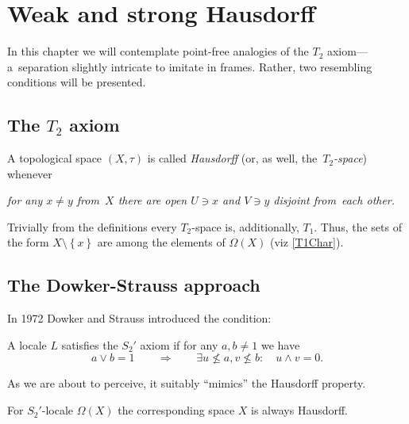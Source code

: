 \chapter{Weak and strong Hausdorff}

In this chapter we will contemplate point-free analogies of the $T_2$
axiom---a~separation slightly intricate to imitate in frames.
Rather, two resembling conditions will be presented.

\section{The $T_2$ axiom}

\begin{framed}
  \begin{df}[$T_2$]
    A topological space $(X, \tau)$ is called \emph{Hausdorff\/} (or, as well,
    the~\emph{$T_2$-space\/}) whenever
    \begin{center} \it
      for any $x \ne y$ from~$X$ there are open $U\owns x$ and $V\owns y$
      disjoint from~each other.
    \end{center}
  \end{df}
\end{framed}

\begin{rem} \label{T2->T1}
  Trivially from the definitions every $T_2$-space is, additionally, $T_1$.
  Thus, the sets of the form $X\setminus \left\{x\right\}$ are among the
  elements of $\Omega(X)$ (viz \ref{T1Char}).
\end{rem}

\section{The Dowker-Strauss approach}

In 1972 Dowker and Strauss \cite{ds72} introduced the condition:

\begin{framed}
  \begin{df}[$S_2'$]
    A locale $L$ satisfies the $S_2'$ axiom if for any $a, b \ne 1$ we have
    \[
      a \vee b = 1 \qquad \Rightarrow \qquad \exists u\not\leq a, v\not\leq
      b: \quad u \wedge v = 0.
    \]
  \end{df}
\end{framed}

As we are about to perceive, it suitably ``mimics'' the Hausdorff property.

\begin{prop} \label{S2'->Haus}
  For $S_2'$-locale $\Omega(X)$ the corresponding space $X$ is always
  Hausdorff.
\end{prop}

